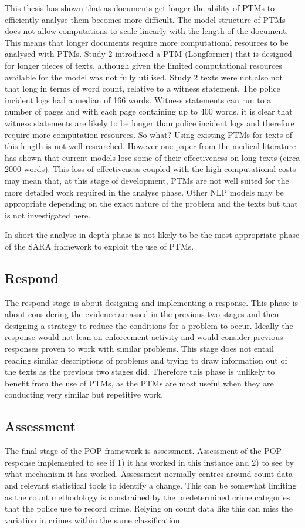 This thesis has shown that as documents get longer the ability of PTMs to efficiently analyse them becomes more difficult. The model structure of PTMs does not allow computations to scale linearly with the length of the document. This means that longer documents require more computational resources to be analysed with PTMs. Study 2 introduced a PTM (Longformer) that is designed for longer pieces of texts, although given the limited computational resources available for  the model was not fully utilised. Study 2 texts were not also not that long in terms of word count, relative to a witness statement. The police incident logs had a median of 166 words. Witness statements can run to a number of pages and with each page containing up to 400 words, it is clear that witness statements are likely to be longer than police incident logs and therefore require more computation resources. So what? Using existing PTMs for texts of this length is not well researched. However one paper from the medical literature \parencite{limitations_of_transformers} has shown that current models lose some of their effectiveness on long texts (circa 2000 words). This loss of effectiveness coupled with the high computational costs may mean that, at this stage of development, PTMs are not well suited for the more detailed work required in the analyse phase. Other NLP models may be appropriate depending on the exact nature of the problem and the texts but that is not investigated here. 

In short the analyse in depth phase is not likely to be the most appropriate phase of the SARA framework to exploit the use of PTMs.


\subsection{Respond} The respond stage is about designing and implementing a response. This phase is about considering the evidence amassed in the previous two stages and then designing a strategy to reduce the conditions for a problem to occur. Ideally the response would not lean on enforcement activity and would consider previous responses proven to work with similar problems. This stage does not entail reading similar descriptions of problems and trying to draw information out of the texts as the previous two stages did. Therefore this phase is unlikely to benefit from the use of PTMs, as the PTMs are most useful when they are conducting very similar but repetitive work.  

  
\subsection{Assessment} The final stage of the POP framework is assessment. Assessment of the POP response implemented to see if 1) it has worked in this instance and 2) to see by what mechanism it has worked. Assessment normally centres around count data and relevant statistical tools to identify a change. This can be somewhat limiting as the count methodology is constrained by the predetermined crime categories that the police use to record crime. Relying on count data like this can miss the variation in crimes within the same classification. 

